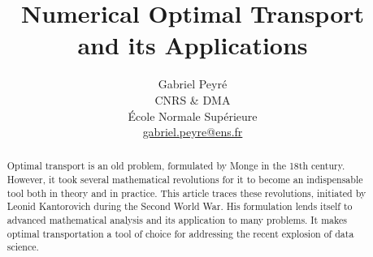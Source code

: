 \documentclass[11pt]{article}
\title{Numerical Optimal Transport\\ and its Applications}
\author{%
\begin{tabular}{c}
	Gabriel Peyr{\'e} \\ CNRS \& DMA \\
	 \'Ecole Normale Sup\'erieure \\
	 \url{gabriel.peyre@ens.fr}
\end{tabular}
}
\date{}
\begin{document}
\maketitle

\begin{abstract}
	Optimal transport is an old problem, formulated by Monge in the 18th century. However, it took several mathematical revolutions for it to become an indispensable tool both in theory and in practice. This article traces these revolutions, initiated by Leonid Kantorovich during the Second World War. His formulation lends itself to advanced mathematical analysis and its application to many problems. It makes optimal transportation a tool of choice for addressing the recent explosion of data science.
\end{abstract}





\end{document}
